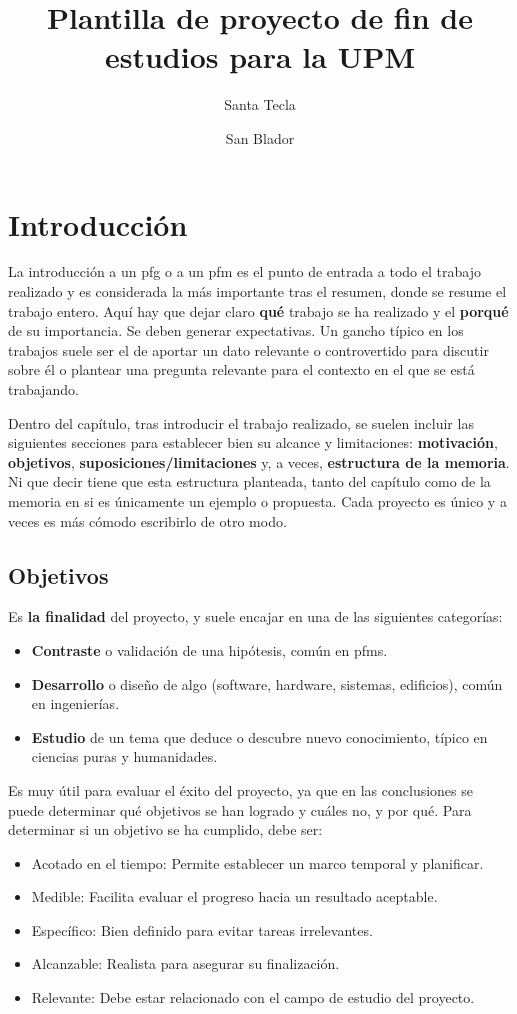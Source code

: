 \documentclass[%
    school=etsisi,%
    type=pfg,%
    degree=61CI,%
]{upm-report}
\title{Plantilla de proyecto de fin de estudios para la UPM}
\author{Santa Tecla \and San Blador}
\begin{document}
\chapter{Introducción}
\label{ch:introduccion}

La introducción a un \gls{pfg} o a un \gls{pfm} es el punto de entrada a
todo el trabajo realizado y es considerada la más importante tras el
resumen, donde se resume el trabajo entero. Aquí hay que dejar claro
\textbf{qué} trabajo se ha realizado y el \textbf{porqué} de su
importancia. Se deben generar expectativas. Un gancho típico en los
trabajos suele ser el de aportar un dato relevante o controvertido para
discutir sobre él o plantear una pregunta relevante para el contexto en
el que se está trabajando.

Dentro del capítulo, tras introducir el trabajo realizado, se suelen
incluir las siguientes secciones para establecer bien su alcance y
limitaciones: \textbf{motivación}, \textbf{objetivos},
\textbf{suposiciones/limitaciones} y, a veces,
\textbf{estructura de la memoria}. Ni que decir tiene que esta
estructura planteada, tanto del capítulo como de la memoria en si es
únicamente un ejemplo o propuesta. Cada proyecto es único y a veces es
más cómodo escribirlo de otro modo.

\section{Objetivos}

Es \textbf{la finalidad} del proyecto, y suele encajar en una de las
siguientes categorías:

\begin{itemize}
    \item \textbf{Contraste} o validación de una hipótesis, común en
        \glspl{pfm}.
    \item \textbf{Desarrollo} o diseño de algo (software, hardware,
        sistemas, edificios), común en ingenierías.
    \item \textbf{Estudio} de un tema que deduce o descubre nuevo
        conocimiento, típico en ciencias puras y humanidades.
\end{itemize}

Es muy útil para evaluar el éxito del proyecto, ya que en las
conclusiones se puede determinar qué objetivos se han logrado y cuáles
no, y por qué. Para determinar si un objetivo se ha cumplido, debe ser:

\begin{itemize}
    \item Acotado en el tiempo: Permite establecer un marco temporal y
        planificar.
    \item Medible: Facilita evaluar el progreso hacia un resultado
        aceptable.
    \item Específico: Bien definido para evitar tareas irrelevantes.
    \item Alcanzable: Realista para asegurar su finalización.
    \item Relevante: Debe estar relacionado con el campo de estudio del
        proyecto.
\end{itemize}
\end{document}
